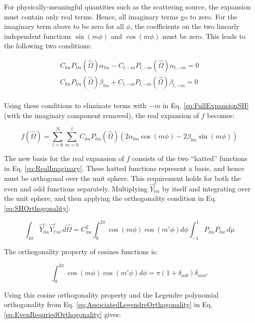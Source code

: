 \documentclass[10pt]{article}
\begin{document}
\begin{flushleft}
\begin{tcolorbox}[breakable]
For physically-meaningful quantities such as the scattering source, the expansion must contain only real terms. Hence, all imaginary terms go to zero. For the imaginary term above to be zero for all \(\phi\), the coefficients on the two linearly independent functions \(\sin{(m\phi)}\) and \(\cos{(m\phi)}\) must be zero. This leads to the following two conditions:

\begin{equation}
\begin{aligned}
C_{lm}P_{lm}(\hat{\Omega})\alpha_{lm}-C_{l,-m}P_{l,-m}(\hat{\Omega})\alpha_{l,-m}=0\\
C_{lm}P_{lm}(\hat{\Omega})\beta_{lm}+C_{l,-m}P_{l,-m}(\hat{\Omega})\beta_{l,-m}=0\\
\end{aligned}
\end{equation}

Using these conditions to eliminate terms with \(-m\) in Eq. \eqref{eq:FullExpansionSH} (with the imaginary component removed), the real expansion of \(f\) becomes:

\begin{equation}
\label{eq:FullExpansionSH2}
f(\hat{\Omega})=\sum_{l=0}^{N}\sum_{m=0}^{l}C_{lm}P_{lm}(\hat{\Omega})\left(2\alpha_{lm}\cos{(m\phi)}-2\beta_{lm}\sin{(m\phi)}\right)
\end{equation}

The new basis for the real expansion of \(f\) consists of the two ``hatted'' functions in Eq. \eqref{eq:RealImaginary}. These hatted functions represent a basis, and hence must be orthogonal over the unit sphere. This requirement holds for both the even and odd functions separately. Multiplying \(\hat{Y}_{lm}^e\) by itself and integrating over the unit sphere, and then applying the orthogonality condition in Eq. \eqref{eq:SHOrthogonality}:

\begin{equation}
\label{eq:EvenRequriedOrthogonality}
\int_{4\pi}^{}\hat{Y}_{lm}^e\hat{Y}_{l'm'}^ed\hat{\Omega}=C_{lm}^2\int_{0}^{2\pi}\cos{(m\phi)}\cos{(m'\phi)}d\phi\int_{-1}^{1}P_{lm}P_{lm'}d\mu
\end{equation}

The orthogonality property of cosines functions is:

\begin{equation}
\int_{0}^{2\pi}\cos{(m\phi)}\cos{(m'\phi)}d\phi=\pi(1+\delta_{m0})\delta_{mm'}
\end{equation}

Using this cosine orthogonality property and the Legendre polynomial orthogonality from Eq. \eqref{eq:AssociatedLegendreOrthogonality} in Eq. \eqref{eq:EvenRequriedOrthogonality} gives:


\end{tcolorbox}
\end{flushleft}
\end{document}
